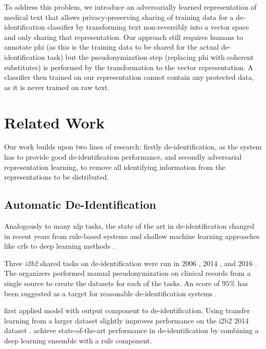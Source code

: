 %
To address this problem, we introduce an adversarially learned representation of medical text that allows privacy-preserving sharing of training data for a de-identification classifier
by transforming text non-reversibly into a vector space and only sharing that representation.
%
Our approach still requires humans to annotate \ac{phi} (as this is the training data to be shared for the actual de-identification task) but the pseudonymization step (replacing \ac{phi} with coherent substitutes) is performed by the transformation to the vector representation.
%
A classifier then trained on our representation cannot contain any protected data, as it is never trained on raw text.

\section{Related Work}\label{sec:related}
%
Our work builds upon two lines of research: firstly de-identification,
as the system has to provide good de-identification performance, and
secondly adversarial representation learning, to remove all identifying
information from the representations to be distributed.


\subsection{Automatic De-Identification}
%
Analogously to many \ac{nlp} tasks, the state of the art in de-identification changed in recent years from rule-based systems and shallow machine learning approaches like \acp{crf} \citep{uzuner2007evaluating,meystre2010automatic} to deep learning methods \citep{stubbs2017identification, dernoncourt2017identification, liu2017identification}.

%
Three \emph{i2b2} shared tasks on de-identification were run in 2006 \citep{uzuner2007evaluating}, 2014 \citep{stubbs2015automated}, and 2016 \citep{stubbs2017identification}.
%
The organizers performed manual pseudonymization on clinical records from a single source to create the datasets for each of the tasks.
%
An \fone score of $95\%$ has been suggested as a target for reasonable de-identification systems \citep{stubbs2015automated}.

%
\citet{dernoncourt2017identification} first applied  \citep{hochreiter1997long} model with  output component to de-identification.
%
Using transfer learning from a larger dataset slightly improves performance on the i2b2 2014 dataset \citep{lee2017transfer}.
%
\citet{liu2017identification} achieve state-of-the-art performance in de-identification by combining a deep learning ensemble with a rule component.


